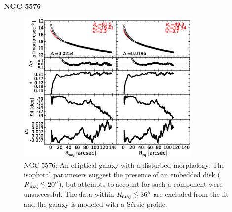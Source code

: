 \documentclass[preprint2]{emulateapj}
\newcommand{\fitfigurewidth}{0.8\textwidth}
\begin{document}
  \clearpage\newpage\noindent

  {\bf NGC 5576 \\}

  \begin{figure}[h]
  \begin{center}
  \includegraphics[width=\fitfigurewidth]{n5576_1Dfit.eps}
  \caption{NGC 5576: 
  An elliptical galaxy with a disturbed morphology. 
  The isophotal parameters suggest the presence of an embedded disk ($R_{\rm maj} \lesssim 20''$), 
  but attempts to account for such a component were unsuccessful. 
  The data within $R_{\rm maj} \lesssim 36''$ are excluded from the fit 
  and the galaxy is modeled with a S\'ersic profile.
  } 
  \end{center}
  \end{figure}
  
\end{document}
